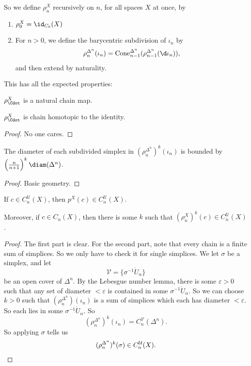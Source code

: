 \documentclass[a4paper]{article}
\theoremstyle{definition}
\begin{document}
So we define $\rho_n^X$ recursively on $n$, for all spaces $X$ at once, by
\begin{enumerate}
  \item $\rho_0^X = \id_{C_0}(X)$
  \item For $n > 0$, we define the barycentric subdivision of $\iota_n$ by
    \[
      \rho_n^{\Delta^n}(\iota_n) = \mathrm{Cone}_{n - 1}^{\Delta^n} (\rho_{n - 1}^{\Delta^n} (\d \iota_n)),
    \]
    and then extend by naturality.
\end{enumerate}

This has all the expected properties:
\begin{lemma}
  $\rho_\Cdot^X$ is a natural chain map.
\end{lemma}

\begin{lemma}
  $\rho_\Cdot^X$ is chain homotopic to the identity.
\end{lemma}

\begin{proof}
  No one cares.
\end{proof}

\begin{lemma}
  The diameter of each subdivided simplex in $(\rho_n^{\Delta^n})^k(\iota_n)$ is bounded by $\left(\frac{n}{n + 1}\right)^k \diam(\Delta^n)$.
\end{lemma}

\begin{proof}
  Basic geometry.
\end{proof}

\begin{prop}
  If $c \in C_n^\mathcal{U}(X)$, then $p^X(c) \in C_n^{\mathcal{U}}(X)$.

  Moreover, if $c \in C_n(X)$, then there is some $k$ such that $(\rho_n^{X})^k(c) \in C_n^{\mathcal{U}}(X)$.
\end{prop}

\begin{proof}
  The first part is clear. For the second part, note that every chain is a finite sum of simplices. So we only have to check it for single simplices. We let $\sigma$ be a simplex, and let
  \[
    \mathcal{V} = \{\sigma^{-1} \mathring{U}_\alpha\}
  \]
  be an open cover of $\Delta^n$. By the Lebesgue number lemma, there is some $\varepsilon > 0$ such that any set of diameter $< \varepsilon$ is contained in some $\sigma^{-1} \mathring{U}_\alpha$. So we can choose $k > 0$ such that $(\rho_n^{\Delta^n}) (\iota_n)$ is a sum of simplices which each has diameter $< \varepsilon$. So each lies in some $\sigma^{-1}\mathring{U}_\alpha$. So
  \[
    (\rho_n^{\Delta^n})^k (\iota_n) = C_n^{\mathcal{V}} (\Delta^n).
  \]
  So applying $\sigma$ tells us
  \[
    (\rho_n^{\Delta^n})^k (\sigma) \in C_n^\mathcal{U}(X).\qedhere
  \]
\end{proof}
\end{document}
